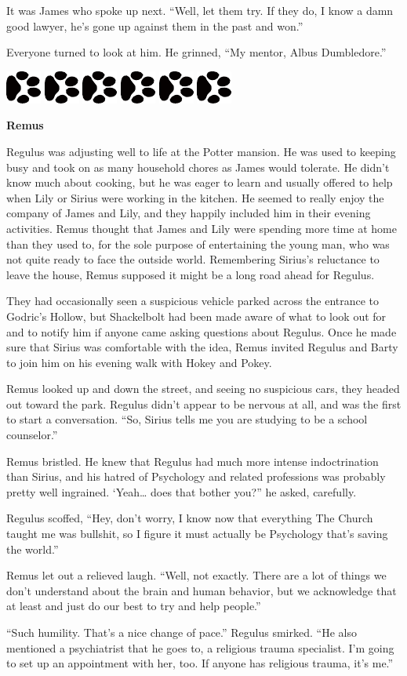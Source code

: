 \documentclass[12pt,twoside,openright]{memoir}
\newcommand{\myrulez}{	
	\begin{center}
		\hspace{.5em}
		\includegraphics[angle=60]{dogprint.pdf}
		\hspace{.5em}
		\includegraphics[angle=120]{dogprint.pdf}
		\hspace{.5em}
		\includegraphics[angle=60]{dogprint.pdf}
		\hspace{.5em}
		\includegraphics[angle=120]{dogprint.pdf}
		\hspace{.5em}
		\includegraphics[angle=60]{dogprint.pdf}
		\hspace{.5em}
		\includegraphics[angle=120]{dogprint.pdf}
		\hspace{.5em}
	\end{center}
}
\begin{document}
It was James who spoke up next. ``Well, let them try. If they do, I know a damn good lawyer, he's gone up against them in the past and won.''

Everyone turned to look at him. He grinned, ``My mentor, Albus Dumbledore.''

\myrulez

\textbf{Remus} 

Regulus was adjusting well to life at the Potter mansion. He was used to keeping busy and took on as many household chores as James would tolerate. He didn't know much about cooking, but he was eager to learn and usually offered to help when Lily or Sirius were working in the kitchen. He seemed to really enjoy the company of James and Lily, and they happily included him in their evening activities. Remus thought that James and Lily were spending more time at home than they used to, for the sole purpose of entertaining the young man, who was not quite ready to face the outside world. Remembering Sirius's reluctance to leave the house, Remus supposed it might be a long road ahead for Regulus. 

They had occasionally seen a suspicious vehicle parked across the entrance to Godric's Hollow, but Shackelbolt had been made aware of what to look out for and to notify him if anyone came asking questions about Regulus. Once he made sure that Sirius was comfortable with the idea, Remus invited Regulus and Barty to join him on his evening walk with Hokey and Pokey.

Remus looked up and down the street, and seeing no suspicious cars, they headed out toward the park. Regulus didn't appear to be nervous at all, and was the first to start a conversation. ``So, Sirius tells me you are studying to be a school counselor.''

Remus bristled. He knew that Regulus had much more intense indoctrination than Sirius, and his hatred of Psychology and related professions was probably pretty well ingrained. ‘Yeah… does that bother you?'' he asked, carefully. 

Regulus scoffed, ``Hey, don't worry, I know now that everything The Church taught me was bullshit, so I figure it must actually be Psychology that's saving the world.''

Remus let out a relieved laugh. ``Well, not exactly. There are a lot of things we don't understand about the brain and human behavior, but we acknowledge that at least and just do our best to try and help people.''

``Such humility. That's a nice change of pace.'' Regulus smirked. ``He also mentioned a psychiatrist that he goes to, a religious trauma specialist. I'm going to set up an appointment with her, too. If anyone has religious trauma, it's me.'' 
\end{document}
